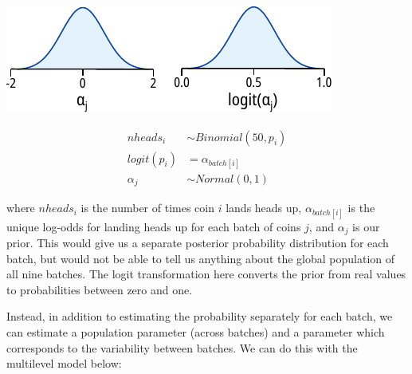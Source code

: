 \begin{minipage}{.5\textwidth}
\centering
\includegraphics[width=\textwidth]{coinflip_priors_1.pdf}
\end{minipage}
\begin{minipage}{.5\textwidth}
\centering
\begin{equation} \label{eq:coinflip_priors_1}
\begin{split}
nheads_i &\sim Binomial(50, p_i) \\
logit(p_i) &= \alpha_{batch[i]} \\
\alpha_j &\sim Normal(0, 1)
\end{split}
\end{equation}
\end{minipage}

where $nheads_i$ is the number of times coin $i$ lands heads up, $\alpha_{batch[i]}$ is the unique log-odds for landing heads up for each batch of coins $j$, and $\alpha_j$ is our prior.
This would give us a separate posterior probability distribution for each batch, but would not be able to tell us anything about the global population of all nine batches.
The logit transformation here converts the prior from real values to probabilities between zero and one.

Instead, in addition to estimating the probability separately for each batch, we can estimate a population parameter (across batches) and a parameter which corresponds to the variability between batches.
We can do this with the multilevel model below:

